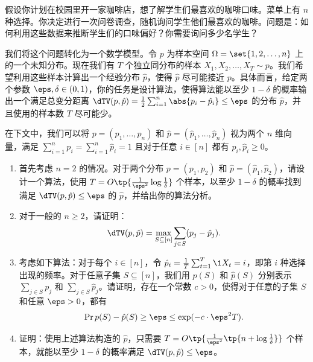 \begin{problem}
假设你计划在校园里开一家咖啡店，想了解学生们最喜欢的咖啡口味。菜单上有 $n$ 种选择。你决定进行一次问卷调查，随机询问学生他们最喜欢的咖啡。问题是：如何利用这些数据来推断学生们的口味偏好？你需要询问多少名学生？

我们将这个问题转化为一个数学模型。令 $p$ 为样本空间 $\Omega = \set{1, 2, \dots, n}$ 上的一个未知分布。现在我们有 $T$ 个独立同分布的样本 $X_1, X_2, \dots, X_T \sim p$。我们希望利用这些样本计算出一个经验分布 $\hat{p}$，使得 $\hat{p}$ 尽可能接近 $p$。具体而言，给定两个参数 $\eps, \delta \in (0, 1)$，你的任务是设计算法，使得算法能以至少 $1 - \delta$ 的概率输出一个满足总变分距离 $\dTV(p, \hat{p}) = \frac{1}{2} \sum_{i=1}^n \abs{p_i - \hat{p}_i} \le \eps$ 的分布 $\hat{p}$，并且使用的样本数 $T$ 尽可能少。

在下文中，我们可以将 $p = (p_1, \dots, p_n)$ 和 $\hat{p} = (\hat{p}_1, \dots, \hat{p}_n)$ 视为两个 $n$ 维向量，满足 $\sum_{i=1}^n p_i = \sum_{i=1}^n \hat{p}_i = 1$ 且对于任意 $i \in [n]$ 都有 $p_i, \hat{p}_i \ge 0$。

\begin{enumerate}
    \item 首先考虑 $n = 2$ 的情况。对于两个分布 $p = (p_1, p_2)$ 和 $\hat{p} = (\hat{p}_1, \hat{p}_2)$，请设计一个算法，使用 $T = O\tp{\frac{1}{\eps^2} \log \frac{1}{\delta}}$ 个样本，以至少 $1 - \delta$ 的概率找到满足 $\dTV(p, \hat{p}) \le \eps$ 的 $\hat{p}$，并给出你的算法分析。
    \item 对于一般的 $n \ge 2$，请证明：
    \[
        \dTV(p, \hat{p}) = \max_{S \subseteq [n]} \sum_{j \in S} (p_j - \hat{p}_j).
    \]
    \item 考虑如下算法：对于每个 $i \in [n]$，令 $\hat{p}_i = \frac{1}{T} \sum_{t=1}^T \1{X_t = i}$，即第 $i$ 种选择出现的频率。对于任意子集 $S \subseteq [n]$，我们用 $p(S)$ 和 $\hat{p}(S)$ 分别表示 $\sum_{j \in S} p_j$ 和 $\sum_{j \in S} \hat{p}_j$。请证明，存在一个常数 $c > 0$，使得对于任意的子集 $S$ 和任意 $\eps > 0$，都有
    \[
        \Pr{p(S) - \hat{p}(S) \ge \eps} \le \exp(-c \cdot \eps^2 T).
    \]
    \item 证明：使用上述算法构造的 $\hat{p}$，只需要 $T = O\tp{\frac{1}{\eps^2}\tp{n + \log \frac{1}{\delta}}}$ 个样本，就能以至少 $1 - \delta$ 的概率满足 $\dTV(p, \hat{p}) \le \eps$。
\end{enumerate}
\end{problem}
